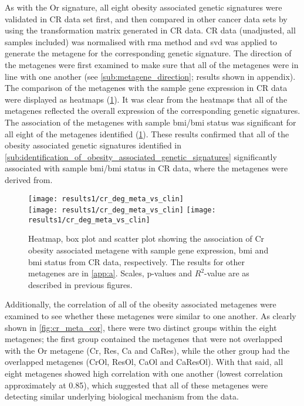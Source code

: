 As with the Or signature, all eight obesity associated genetic signatures were validated in CR data set first, and then compared in other cancer data sets by using the transformation matrix generated in CR data.
CR data (unadjusted, all samples included) was normalised with \gls{rma} method and \gls{svd} was applied to generate the metagene for the corresponding genetic signature.
The direction of the metagenes were first examined to make sure that all of the metagenes were in line with one another (see \cref{sub:metagene_direction}; results shown in appendix).
The comparison of the metagenes with the sample gene expression in CR data were displayed as heatmaps (\cref{fig:degmetacr}).
It was clear from the heatmaps that all of the metagenes reflected the overall expression of the corresponding genetic signatures.
The association of the metagenes with sample \gls{bmi}/\gls{bmi} status was significant for all eight of the metagenes identified (\cref{fig:degmetacr}).
These results confirmed that all of the obesity associated genetic signatures identified in \cref{sub:identification_of_obesity_associated_genetic_signatures} significantly associated with sample \gls{bmi}/\gls{bmi} status in CR data, where the metagenes were derived from.

\begin{figure}[htp!]
	\centering
	\texttt{[image: results1/cr\_deg\_meta\_vs\_clin]}\\
	\vspace{1em}
	\texttt{[image: results1/cr\_deg\_meta\_vs\_clin]}
	\hfill
	\texttt{[image: results1/cr\_deg\_meta\_vs\_clin]}
	\caption[Cr obesity associated metagene in CR data]{Heatmap, box plot and scatter plot showing the association of Cr obesity associated metagene with sample gene expression, \gls{bmi} and \gls{bmi} status from CR data, respectively.
	The results for other metagenes are in \cref{app:a}.
	Scales, p-values and $R^2$-value are as described in previous figures.}
	\label{fig:degmetacr}
\end{figure}

Additionally, the correlation of all of the obesity associated metagenes were examined to see whether these metagenes were similar to one another.
As clearly shown in \cref{fig:cr_meta_cor}, there were two distinct groups within the eight metagenes; the first group contained the metagenes that were not overlapped with the Or metagene (Cr, Res, Ca and CaRes), while the other group had the overlapped metagenes (CrOl, ResOl, CaOl and CaResOl).
With that said, all eight metagenes showed high correlation with one another (lowest correlation approximately at 0.85), which suggested that all of these metagenes were detecting similar underlying biological mechanism from the data.

